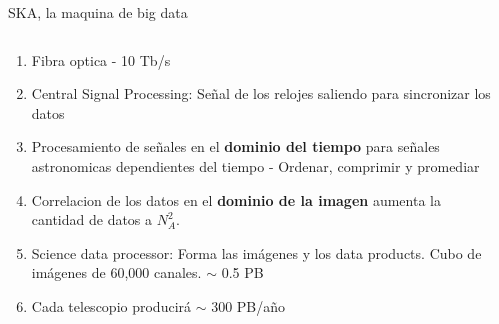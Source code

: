 \documentclass[xetex,aspectratio=169]{beamer}
\newcommand\Fontvi{\fontsize{10pt}{7.2}\selectfont}
\begin{document}
	\begin{frame}{SKA, la maquina de big data}
		\Fontvi
		\begin{columns}
			\begin{column}{0.48\textwidth}
				\begin{enumerate}
					\item Fibra optica - 10 Tb/s
					\item Central Signal Processing: Señal de los relojes saliendo para sincronizar los datos
					\item Procesamiento de señales en el \textbf{dominio del tiempo} para señales astronomicas dependientes del tiempo - Ordenar, comprimir y promediar
					\item Correlacion de los datos en el \textbf{dominio de la imagen} aumenta la cantidad de datos a $N_A^2$.
					\item Science data processor: Forma las imágenes y los data products. Cubo de imágenes de 60,000 canales. $\sim$ 0.5 PB
					\item Cada telescopio producirá $\sim$ 300 PB/año
				\end{enumerate}
			\end{column}
			\begin{column}{0.48\textwidth}
			\end{column}
		\end{columns}
	\end{frame}
\end{document}
